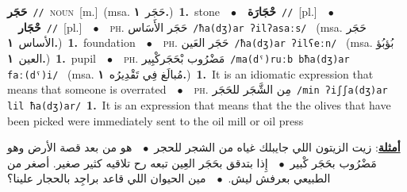\documentclass[10pt,a4paper,twoside]{article} %
\begin{document}
\begin{multicols}{2}
{{{{{{{{{{{\setlength\topsep{0pt}\textbf{\foreignlanguage{arabic}{حَجَر}}\ {\color{gray}\texttt{//}\color{black}}\ \textsc{noun}\ [m.]\ \color{gray}(msa. \foreignlanguage{arabic}{حَجَر}~\foreignlanguage{arabic}{\textbf{١.}})\color{black}\ \textbf{1.}~stone\ \ $\bullet$\ \ \setlength\topsep{0pt}\textbf{\foreignlanguage{arabic}{حْجَارَة}}\ {\color{gray}\texttt{//}\color{black}}\ [pl.]\ \ $\bullet$\ \ \setlength\topsep{0pt}\textbf{\foreignlanguage{arabic}{حْجَار}}\ {\color{gray}\texttt{//}\color{black}}\ [pl.]\ \ $\bullet$\ \ \textsc{ph.} \color{gray} \foreignlanguage{arabic}{حَجَر الأَسَاس}\color{black}\ {\color{gray}\texttt{/{\sffamily ħa(dʒ)ar ʔilʔasaːs}/}\color{black}}\ \color{gray} (msa. \foreignlanguage{arabic}{حَجَر الأساس}~\foreignlanguage{arabic}{\textbf{١.}})\color{black}\ \textbf{1.}~foundation\ \ $\bullet$\ \ \textsc{ph.} \color{gray} \foreignlanguage{arabic}{حَجَر العَين}\color{black}\ {\color{gray}\texttt{/{\sffamily ħa(dʒ)ar ʔilʕeːn}/}\color{black}}\ \color{gray} (msa. \foreignlanguage{arabic}{بُؤبُؤ العين}~\foreignlanguage{arabic}{\textbf{١.}})\color{black}\ \textbf{1.}~pupil\ \ $\bullet$\ \ \textsc{ph.} \color{gray} \foreignlanguage{arabic}{مَضْرُوب بْحَجَركْبِير}\color{black}\ {\color{gray}\texttt{/{\sffamily ma(dˤ)ruːb bħa(dʒ)ar faː(dˤ)i}/}\color{black}}\ \color{gray} (msa. \foreignlanguage{arabic}{مُبالَغ فِي تَقْدِيرُه}~\foreignlanguage{arabic}{\textbf{١.}})\color{black}\ \textbf{1.}~It is an idiomatic expression that means that someone is overrated\ \ $\bullet$\ \ \textsc{ph.} \color{gray} \foreignlanguage{arabic}{مِن الشَّجَر للحَجَر}\color{black}\ {\color{gray}\texttt{/{\sffamily min ʔiʃʃa(dʒ)ar lil ħa(dʒ)ar}/}\color{black}}\ \textbf{1.}~It is an expression that means that the the olives that have been picked were immediately sent to the oil mill or oil press\  \begin{flushright}\color{gray}\foreignlanguage{arabic}{\textbf{\underline{\foreignlanguage{arabic}{أمثلة}}}: زيت الزيتون اللي جايبلك غياه من الشجر للحجر\ $\bullet$\ \  هو من بعد قصة الأرض وهو مَضْرُوب بحَجَر كْبير\ $\bullet$\ \  إِذا بتدقق بحَجَر العِين تبعه رح تلاقيه كثير صغير. أصغر من الطبيعي بعرفش ليش.\ $\bullet$\ \  مين الحيوان اللي قاعد براجِد بالحجار علينا؟}\end{flushright}\color{black}} \vspace{2mm}

}}}}}}}}}}
\end{multicols}
\end{document}
